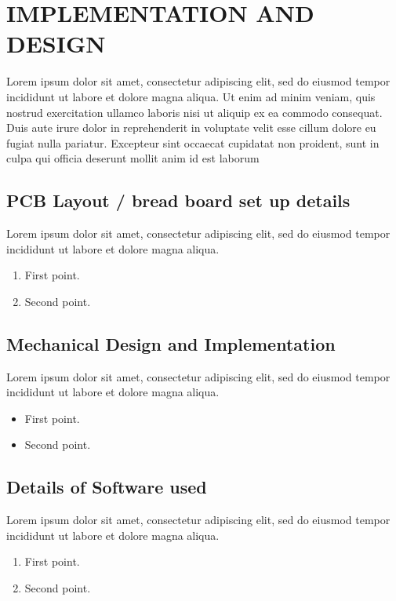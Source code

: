 \documentclass[12pt,a4paper]{report}
\begin{document}
\chapter{IMPLEMENTATION AND DESIGN}
\thispagestyle{empty}
Lorem ipsum dolor sit amet, consectetur adipiscing elit, sed do eiusmod tempor incididunt ut labore et dolore magna aliqua. Ut enim ad minim veniam, quis nostrud exercitation ullamco laboris nisi ut aliquip ex ea commodo consequat. Duis aute irure dolor in reprehenderit in voluptate velit esse cillum dolore eu fugiat nulla pariatur. Excepteur sint occaecat cupidatat non proident, sunt in culpa qui officia deserunt mollit anim id est laborum  


\section{PCB Layout / bread board set up details}
Lorem ipsum dolor sit amet, consectetur adipiscing elit, sed do eiusmod tempor incididunt ut labore et dolore magna aliqua. 

\begin{enumerate}
\item First point.
\item Second point.
\end{enumerate}

\section{Mechanical Design and Implementation}
Lorem ipsum dolor sit amet, consectetur adipiscing elit, sed do eiusmod tempor incididunt ut labore et dolore magna aliqua. 
\begin{itemize}
\item First point.
\item Second point.
\end{itemize}

\section{Details of Software used}
Lorem ipsum dolor sit amet, consectetur adipiscing elit, sed do eiusmod tempor incididunt ut labore et dolore magna aliqua. 

\begin{enumerate}
\item First point.
\item Second point.
\end{enumerate}
\end{document}
